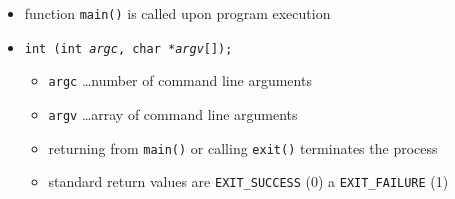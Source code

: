 

\begin{slide}
\renewcommand{\baselinestretch}{0.4}
\begin{itemize}
\setlength{\itemsep}{-0.5ex}
\setlength{\topsep}{1\itemsep}
\item function \texttt{main()} is called upon program execution
\item \texttt{int  (int \emph{argc}, char *\emph{argv}[]);}
    \begin{itemize}
    \item \texttt{argc} \dots number of command line arguments
    \item \texttt{argv} \dots array of command line arguments
    \item returning from \texttt{main()} or calling \texttt{exit()} terminates the
    process
    \item standard return values are \verb#EXIT_SUCCESS# (0) a
    \verb#EXIT_FAILURE# (1)
    \end{itemize}
\end{itemize}

\begin{center}

\end{center}
\end{slide}

